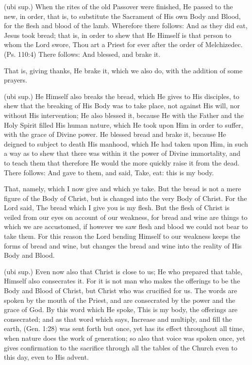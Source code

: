  (ubi sup.) When the rites of the old Passover were finished, He passed to the new, in order, that is, to substitute the Sacrament of His own Body and Blood, for the flesh and blood of the lamb. Wherefore there follows: And as they did eat, Jesus took bread; that is, in order to shew that He Himself is that person to whom the Lord swore, Thou art a Priest for ever after the order of Melchizedec. (Ps. 110:4) There follows: And blessed, and brake it.

 That is, giving thanks, He brake it, which we also do, with the addition of some prayers.

 (ubi sup.) He Himself also breaks the bread, which He gives to His disciples, to shew that the breaking of His Body was to take place, not against His will, nor without His intervention; He also blessed it, because He with the Father and the Holy Spirit filled His human nature, which He took upon Him in order to suffer, with the grace of Divine power. He blessed bread and brake it, because He deigned to subject to death His manhood, which He had taken upon Him, in such a way as to shew that there was within it the power of Divine immortality, and to teach them that therefore He would the more quickly raise it from the dead. There follows: And gave to them, and said, Take, eat: this is my body.

 That, namely, which I now give and which ye take. But the bread is not a mere figure of the Body of Christ, but is changed into the very Body of Christ. For the Lord said, The bread which I give you is my flesh. But the flesh of Christ is veiled from our eyes on account of our weakness, for bread and wine are things to which we are accustomed, if however we saw flesh and blood we could not bear to take them. For this reason the Lord bending Himself to our weakness keeps the forms of bread and wine, but changes the bread and wine into the reality of His Body and Blood.

 (ubi sup.) Even now also that Christ is close to us; He who prepared that table, Himself also consecrates it. For it is not man who makes the offerings to be the Body and Blood of Christ, but Christ who was crucified for us. The words are spoken by the mouth of the Priest, and are consecrated by the power and the grace of God. By this word which He spoke, This is my body, the offerings are consecrated; and as that word which says, Increase and multiply, and fill the earth, (Gen. 1:28) was sent forth but once, yet has its effect throughout all time, when nature does the work of generation; so also that voice was spoken once, yet gives confirmation to the sacrifice through all the tables of the Church even to this day, even to His advent.

